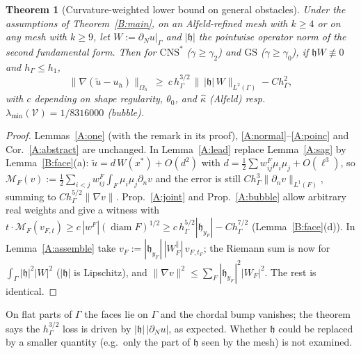 \documentclass[11pt]{article}
\newtheorem{theorem}{Theorem}[section]
\theoremstyle{definition}
\newcommand{\hG}{h_\Gamma}
\newcommand{\Oh}{\Omega_h}
\newcommand{\dn}{\partial_n}
\newcommand{\ut}{\tilde u}
\newcommand{\norm}[1]{\lVert #1\rVert}
\newcommand{\GS}{\mathrm{GS}}
\newcommand{\CNS}{\mathrm{CNS}^\ast}
\newcommand{\M}{\mathcal M}
\newcommand{\hh}{\mathfrak h}
\DeclareMathOperator{\diam}{diam}
\begin{document}
\begin{theorem}[Curvature-weighted lower bound on general obstacles]\label{B:lb}
Under the assumptions of Theorem~\ref{B:main}, on an Alfeld-refined mesh with $k\ge4$ or on any mesh with $k\ge9$, let $W:=\partial_Nu|_\Gamma$ and $|\hh|$ the pointwise operator norm of the second fundamental form. Then for $\CNS$ ($\gamma\ge\gamma_2$) and $\GS$ ($\gamma\ge\gamma_0$), if $\hh W\not\equiv0$ and $\hG\le h_1$,
\[
\norm{\nabla(\ut-u_h)}_{\Oh}\ \ge\ c\,\hG^{3/2}\,\bigl\|\,|\hh|\,W\bigr\|_{L^2(\Gamma)}-C\hG^2 ,
\]
with $c$ depending on shape regularity, $\theta_0$, and $\hat\kappa$ (Alfeld) resp.\ $\lambda_{\min}(\mathcal V)=1/8316000$ (bubble).
\end{theorem}
\begin{proof}
Lemmas~\ref{A:one} (with the remark in its proof), \ref{A:normal}--\ref{A:poinc} and Cor.~\ref{A:abstract} are unchanged. In Lemma~\ref{A:lead} replace Lemma~\ref{A:sag} by Lemma~\ref{B:face}(a): $\ut=d\,W(x^\ast)+O(d^2)$ with $d=\frac12\sum w^F_{ij}\mu_i\mu_j+O(\ell^3)$, so $\M_F(v):=\frac12\sum_{i<j}w^F_{ij}\int_F\mu_i\mu_j\dn v$ and the error is still $C\hG^3\norm{\dn v}_{L^1(F)}$, summing to $C\hG^{5/2}\norm{\nabla v}$. Prop.~\ref{A:joint} and Prop.~\ref{A:bubble} allow arbitrary real weights and give a witness with $t\cdot\M_F(v_{F,t})\ge c\,|w^F|(\diam F)^{1/2}\ge c\,\hG^{5/2}|\hh_{y_F}|-C\hG^{7/2}$ (Lemma~\ref{B:face}(d)). In Lemma~\ref{A:assemble} take $v_F:=|\hh_{y_F}|\,|W_F^\parallel|\,v_{F,t_F}$; the Riemann sum is now for $\int_\Gamma|\hh|^2|W|^2$ ($|\hh|$ is Lipschitz), and $\norm{\nabla v}^2\le\sum_F|\hh_{y_F}|^2|W_F|^2$. The rest is identical.
\end{proof}
On flat parts of $\Gamma$ the faces lie on $\Gamma$ and the chordal bump vanishes; the theorem says the $\hG^{3/2}$ loss is driven by $|\hh|\,|\partial_Nu|$, as expected. Whether $\hh$ could be replaced by a smaller quantity (e.g.\ only the part of $\hh$ seen by the mesh) is not examined.
\end{document}
